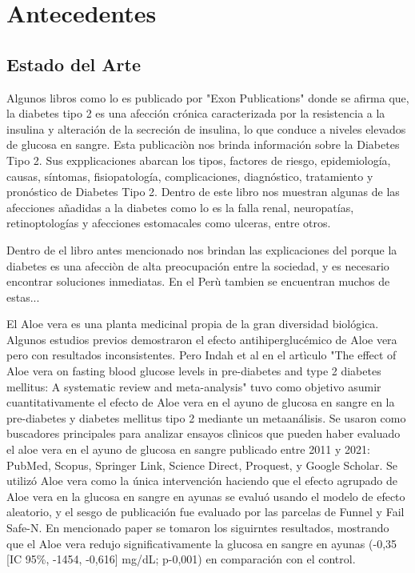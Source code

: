 \chapter{Antecedentes}
\renewcommand{\figurename}{Figura}

\section{Estado del Arte}
Algunos libros como lo es publicado por "Exon Publications" donde se afirma que, la diabetes tipo 2 es una afección crónica caracterizada por la resistencia a la insulina y alteración de la secreción de insulina, lo que conduce a niveles elevados de glucosa en sangre. Esta publicaciòn nos brinda información sobre la Diabetes Tipo 2. Sus expplicaciones abarcan los tipos, factores de riesgo, epidemiología, causas, síntomas, fisiopatología, complicaciones, diagnóstico, tratamiento y pronóstico de Diabetes Tipo 2. 
Dentro de este libro nos muestran algunas de las afecciones añadidas a la diabetes como lo es la falla renal, neuropatías, retinoptologías y afecciones estomacales como ulceras, entre otros.\cite{Publications2024}

Dentro de el libro antes mencionado nos brindan las explicaciones del porque la diabetes es una afecciòn de alta preocupación entre la sociedad, y es necesario encontrar soluciones inmediatas. En el Perù tambien se encuentran muchos de estas...


El Aloe vera es una planta medicinal propia de la gran diversidad biológica. Algunos estudios previos demostraron el efecto antihiperglucémico de Aloe vera pero con resultados inconsistentes. 
Pero Indah et al en el artìculo "The effect of Aloe vera on fasting blood glucose levels in pre-diabetes and type 2 diabetes mellitus: A systematic review and meta-analysis" tuvo como objetivo asumir cuantitativamente el efecto de Aloe vera en el ayuno de glucosa en sangre en la pre-diabetes y diabetes mellitus tipo 2 mediante un metaanálisis.
Se usaron como buscadores principales para analizar ensayos clìnicos que pueden haber evaluado el aloe vera en el ayuno de glucosa en sangre publicado entre 2011 y 2021: PubMed, Scopus, Springer Link, Science Direct, Proquest, y Google Scholar. Se utilizó Aloe vera como la única intervención haciendo que el efecto agrupado de Aloe vera en la glucosa en sangre en ayunas se evaluó usando el modelo de efecto aleatorio, y el sesgo de publicación fue evaluado por las parcelas de Funnel y Fail Safe-N. En mencionado paper se tomaron los siguirntes resultados, mostrando que el Aloe vera redujo significativamente la glucosa en sangre en ayunas (-0,35 [IC 95\%, -1454, -0,616] mg/dL; p-0,001) en comparación con el control. 

